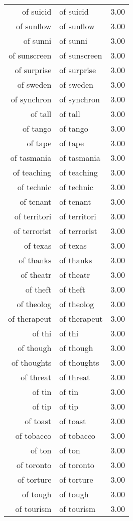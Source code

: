 \begin{table}[ht]
\begin{tabular}{rlr}
  of suicid & of suicid & 3.00 \\ 
  of sunflow & of sunflow & 3.00 \\ 
  of sunni & of sunni & 3.00 \\ 
  of sunscreen & of sunscreen & 3.00 \\ 
  of surprise & of surprise & 3.00 \\ 
  of sweden & of sweden & 3.00 \\ 
  of synchron & of synchron & 3.00 \\ 
  of tall & of tall & 3.00 \\ 
  of tango & of tango & 3.00 \\ 
  of tape & of tape & 3.00 \\ 
  of tasmania & of tasmania & 3.00 \\ 
  of teaching & of teaching & 3.00 \\ 
  of technic & of technic & 3.00 \\ 
  of tenant & of tenant & 3.00 \\ 
  of territori & of territori & 3.00 \\ 
  of terrorist & of terrorist & 3.00 \\ 
  of texas & of texas & 3.00 \\ 
  of thanks & of thanks & 3.00 \\ 
  of theatr & of theatr & 3.00 \\ 
  of theft & of theft & 3.00 \\ 
  of theolog & of theolog & 3.00 \\ 
  of therapeut & of therapeut & 3.00 \\ 
  of thi & of thi & 3.00 \\ 
  of though & of though & 3.00 \\ 
  of thoughts & of thoughts & 3.00 \\ 
  of threat & of threat & 3.00 \\ 
  of tin & of tin & 3.00 \\ 
  of tip & of tip & 3.00 \\ 
  of toast & of toast & 3.00 \\ 
  of tobacco & of tobacco & 3.00 \\ 
  of ton & of ton & 3.00 \\ 
  of toronto & of toronto & 3.00 \\ 
  of torture & of torture & 3.00 \\ 
  of tough & of tough & 3.00 \\ 
  of tourism & of tourism & 3.00 \\ 

\end{tabular}
\end{table}
